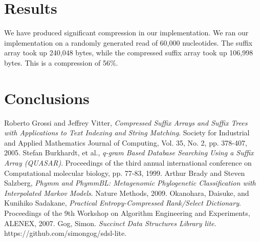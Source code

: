 \documentclass{article}
\begin{document}
\section{Results}
\label{sec-results}
We have produced significant compression in our implementation. We ran our implementation on a randomly generated read of 60,000 nucleotides. The suffix array took up 240,048 bytes, while the compressed suffix array took up 106,998 bytes. This is a compression of 56\%.\\
\section{Conclusions}
\label{sec-conclusions}

\begin{thebibliography}{1}
	Roberto Grossi and Jeffrey Vitter,
	\emph{Compressed Suffix Arrays and Suffix Trees with Applications to Text Indexing and String Matching}.
	Society for Industrial and Applied Mathematics Journal of Computing,
	Vol. 35, No. 2, pp. 378-407,
	2005.
	Stefan Burkhardt, et al.,
	\emph{q-gram Based Database Searching Using a Suffix Array (QUASAR)}.
	Proceedings of the third annual international conference on Computational molecular biology,
	pp. 77-83,
	1999.
	Arthur Brady and Steven Salzberg,
	\emph{Phymm and PhymmBL: Metagenomic Phylogenetic Classification with Interpolated Markov Models}.
	Nature Methods,
	2009.
	Okanohara, Daisuke, and Kunihiko Sadakane,
	\emph{Practical Entropy-Compressed Rank/Select Dictionary}. 
	Proceedings of the 9th Workshop on Algorithm Engineering and Experiments,
	ALENEX,
	2007.
	Gog, Simon.
	\emph{Succinct Data Structures Library lite}.
	https://github.com/simongog/sdsl-lite.
\end{thebibliography}
\end{document}
